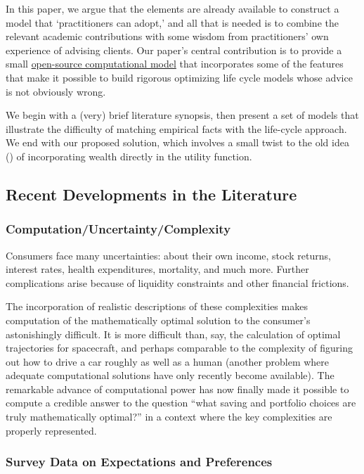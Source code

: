 \documentclass{article}
\begin{document}
In this paper, we argue that the elements are already available to construct a model that `practitioners can adopt,' and all that is needed is to combine the relevant academic contributions with some wisdom from practitioners' own experience of advising clients.
Our paper's central contribution is to provide a small \href{github.com/econ-ark/life-cycle-prime-time}{open-source computational model} that incorporates some of the features that make it possible to build rigorous optimizing life cycle models whose advice is not obviously wrong.

We begin with a (very) brief literature synopsis, then present a set of models that illustrate the difficulty of matching empirical facts with the life-cycle approach.
We end with our proposed solution, which involves a small twist to the old idea (\cite{carrollWhyDoTheRich}) of incorporating wealth directly in the utility function.

\subsection{Recent Developments in the Literature}

\subsubsection{Computation/Uncertainty/Complexity}

Consumers face many uncertainties: about their own income, stock returns, interest rates, health expenditures, mortality, and much more.
Further complications arise because of liquidity constraints and other financial frictions.

The incorporation of realistic descriptions of these complexities makes computation of the mathematically optimal solution to the consumer's astonishingly difficult.
It is more difficult than, say, the calculation of optimal trajectories for spacecraft, and perhaps comparable to the complexity of figuring out how to drive a car roughly as well as a human (another problem where adequate computational solutions have only recently become available).
The remarkable advance of computational power has now finally made it possible to compute a credible answer to the question ``what saving and portfolio choices are truly mathematically optimal?'' in a context where the key complexities are properly represented.

\subsubsection{Survey Data on Expectations and Preferences}
\end{document}
